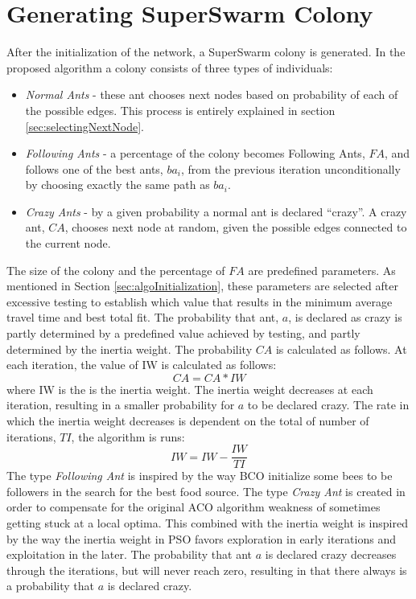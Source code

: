 \section{Generating SuperSwarm Colony}
\label{sec:algoGeneratingSuperSwarm}
After the initialization of the network, a SuperSwarm colony is generated. In the proposed algorithm a colony consists of three types of individuals:
\begin{itemize}
\item \textit{Normal Ants} - these ant chooses next nodes based on probability of each of the possible edges. This process is entirely explained in section \vref{sec:selectingNextNode}.
\item \textit{Following Ants} - a percentage of the colony becomes Following Ants, $FA$, and follows one of the best ants, $ba_i$, from the previous iteration unconditionally by choosing exactly the same path as $ba_i$.
\item \textit{Crazy Ants} - by a given probability a normal ant is declared ``crazy''. A crazy ant, $CA$, chooses next node at random, given the possible edges connected to the current node.  
\end{itemize}

The size of the colony and the percentage of $FA$ are predefined parameters. As mentioned in Section \vref{sec:algoInitialization}, these parameters are selected after excessive testing to establish which value that results in the minimum average travel time and best total fit. The probability that ant, $a$, is declared as crazy is partly determined by a predefined value achieved by testing, and partly determined by the inertia weight. The probability $CA$ is calculated as follows. At each iteration, the value of IW is calculated as follows: 
\newline
$$CA = CA*IW$$
\newline
where IW is the is the inertia weight. The inertia weight decreases at each iteration, resulting in a smaller probability for $a$ to be declared crazy. The rate in which the inertia weight decreases is dependent on the total of number of iterations, $TI$, the algorithm is runs:
\newline
$$IW = IW - \frac{IW}{TI}$$
\newline
The type \textit{Following Ant} is inspired by the way BCO initialize some bees to be followers in the search for the best food source. The type \textit{Crazy Ant} is created in order to compensate for the original ACO algorithm weakness of sometimes getting stuck at a local optima. This combined with the inertia weight is inspired by the way the inertia weight in PSO favors exploration in early iterations and exploitation in the later. The probability that ant $a$ is declared crazy decreases through the iterations, but will never reach zero, resulting in that there always is a probability that $a$ is declared crazy. 